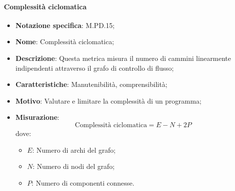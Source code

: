 \paragraph*{Complessità ciclomatica}
\begin{itemize}
    \item \textbf{Notazione specifica}: M.PD.15;
    \item \textbf{Nome}: Complessità ciclomatica;
    \item \textbf{Descrizione}: Questa metrica misura il numero di cammini linearmente indipendenti attraverso il grafo di controllo di flusso;
    \item \textbf{Caratteristiche}: Manutenibilità, comprensibilità;
    \item \textbf{Motivo}: Valutare e limitare la complessità di un programma;
    \item \textbf{Misurazione}: 
    \[
    \text{Complessità ciclomatica} = \textit{E} - \textit{N} + \textit{2P}
    \]
    dove:
    \begin{itemize}
        \item $E$: Numero di archi del grafo;
        \item $N$: Numero di nodi del grafo;
        \item $P$: Numero di componenti connesse.
    \end{itemize}
\end{itemize}
